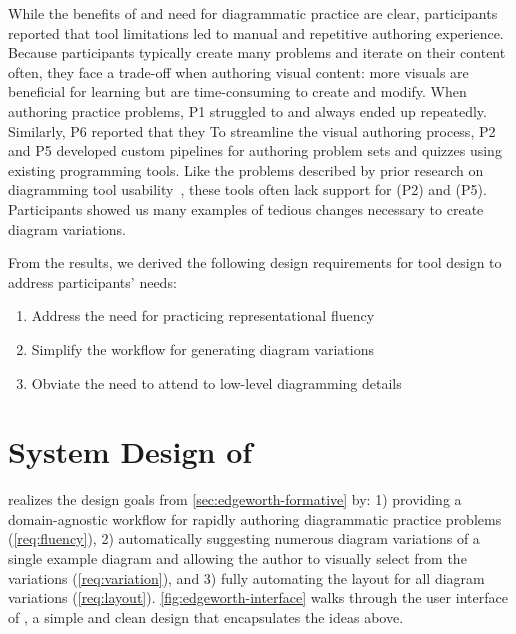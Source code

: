 While the benefits of and need for diagrammatic practice are clear, participants reported that tool limitations led to manual and repetitive authoring experience. Because participants typically create many problems and iterate on their content often, they face a trade-off when authoring visual content: more visuals are beneficial for learning but are time-consuming to create and modify. When authoring practice problems, P1 struggled to  and always ended up  repeatedly. Similarly, P6 reported that they  To streamline the visual authoring process, P2 and P5 developed custom pipelines for authoring problem sets and quizzes using existing programming tools. Like the problems described by prior research on diagramming tool usability~\cite{naturalDiagramming}, these tools often lack support for  (P2) and  (P5). Participants showed us many examples of tedious changes necessary to create diagram variations.

From the results, we derived the following design requirements for tool design to address participants' needs:

\begin{enumerate}[label=\textbf{D\arabic*}]
    \item\label{req:fluency} Address the need for practicing representational fluency
    \item\label{req:variation} Simplify the workflow for generating diagram variations
    \item\label{req:layout} Obviate the need to attend to low-level diagramming details
\end{enumerate}



\section{System Design of \Edgeworth}
\label{sec:system-design}


\Edgeworth realizes the design goals from \cref{sec:edgeworth-formative} by: 1) providing a domain-agnostic workflow for rapidly authoring diagrammatic practice problems (\ref{req:fluency}), 2) automatically suggesting numerous diagram variations of a single example diagram and allowing the author to visually select from the variations (\ref{req:variation}), and 3) fully automating the layout for all diagram variations (\ref{req:layout}). \cref{fig:edgeworth-interface} walks through the user interface of \Edgeworth, a simple and clean design that encapsulates the ideas above.

